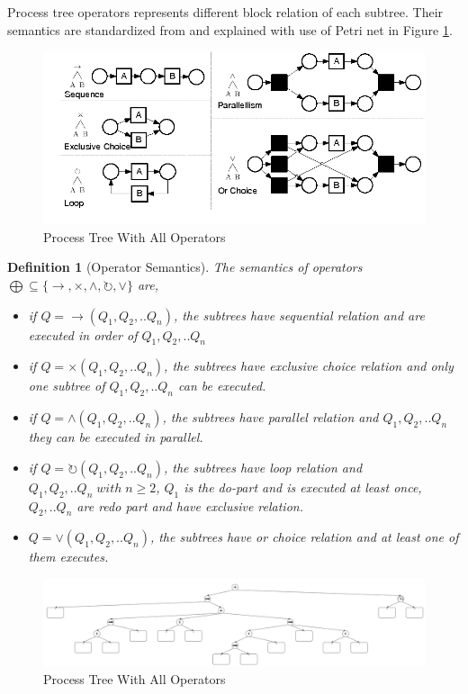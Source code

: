 \documentclass[]{article}
\newtheorem{mydef}{Definition}[section]
\begin{document}
Process tree operators represents different block relation of each subtree. Their semantics are standardized from \cite{vanderAalst:2016:PMD:2948762, Buijs2012OnTR} and explained with use of Petri net in Figure \ref{fig:pn_pt_relation}\cite{Buijs2012OnTR}.
\begin{figure}[h!]
 	\includegraphics[width=\textwidth]{PT05_Petrinet_PT_Relation.png}
 	\caption{Process Tree With All Operators}
 	\label{fig:pn_pt_relation}
\end{figure}
\begin{mydef}[Operator Semantics] 
	The semantics of operators $\bigoplus \subseteq \{\rightarrow, \times, \land, \circlearrowright, \vee \}$ are,
	\begin{itemize}
		\item if $Q= \rightarrow(Q_1 , Q_2 ,.. Q_n)$, the subtrees have sequential relation and are executed in order of $Q_1,Q_2,..Q_n$
		\item if $Q= \times(Q_1 , Q_2 ,.. Q_n)$,  the subtrees have exclusive choice relation and only one subtree of $Q_1,Q_2,..Q_n$   can be executed.
		\item if $Q= \land (Q_1 , Q_2 ,.. Q_n)$,  the subtrees have parallel relation and $Q_1,Q_2,..Q_n$ they can be executed in parallel.
		\item if $Q= \circlearrowright(Q_1 , Q_2 ,.. Q_n)$,  the subtrees have loop relation and $Q_1,Q_2,..Q_n \; with\; n\geq2$, $Q_1$ is the do-part and is executed at least once, $Q_2,..Q_n$ are redo part and have exclusive relation.
		\item $Q=\vee(Q_1 , Q_2 ,.. Q_n)$, the subtrees have or choice relation and at least one of them executes.
	\end{itemize}
\end{mydef}
\begin{figure}[h!]
	\includegraphics[width=\textwidth]{PT01_Not_Nested_Overview.png}
	\caption{Process Tree With All Operators}
	\label{fig:not_nested_overview}
\end{figure}
\end{document}
